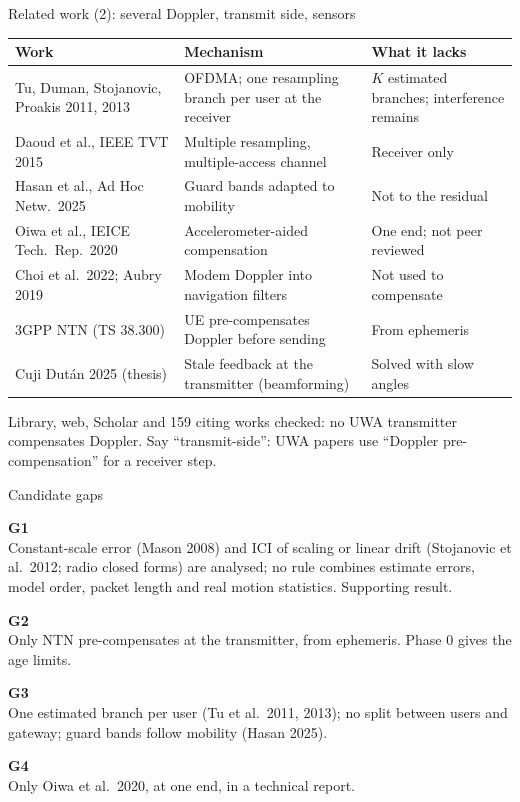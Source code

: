 \documentclass[aspectratio=169,11pt]{beamer}
\newcommand{\gapbox}[3]{%
  \begin{tcolorbox}[colback=foam!60,colframe=foam!60,arc=2mm,boxrule=0pt,left=2mm,right=2mm,top=0.6mm,bottom=0.6mm,before skip=0.8mm,after skip=0.8mm]
  {\bfseries\color{teal}#1}\hspace{1mm}{\small\bfseries #2}\\
  {\footnotesize #3}
  \end{tcolorbox}}
\begin{document}
\begin{frame}{Related work (2): several Doppler, transmit side, sensors}
\scriptsize\setlength{\tabcolsep}{3pt}\renewcommand{\arraystretch}{0.92}
\begin{tabular}{@{}L{0.33\textwidth}L{0.33\textwidth}L{0.30\textwidth}@{}}
\toprule
\textbf{Work} & \textbf{Mechanism} & \textbf{What it lacks}\\
\midrule
Tu, Duman, Stojanovic, Proakis 2011, 2013 & OFDMA; one resampling branch per user at the receiver & $K$ estimated branches; interference remains\\
Daoud et al., IEEE TVT 2015 & Multiple resampling, multiple-access channel & Receiver only\\
Hasan et al., Ad Hoc Netw.\ 2025 & Guard bands adapted to mobility & Not to the residual\\
Oiwa et al., IEICE Tech.\ Rep.\ 2020 & Accelerometer-aided compensation & One end; not peer reviewed\\
Choi et al.\ 2022; Aubry 2019 & Modem Doppler into navigation filters & Not used to compensate\\
3GPP NTN (TS 38.300) & UE pre-compensates Doppler before sending & From ephemeris\\
Cuji Dut\'an 2025 (thesis) & Stale feedback at the transmitter (beamforming) & Solved with slow angles\\
\bottomrule
\end{tabular}

\vspace{1mm}
\footnotesize Library, web, Scholar and 159 citing works checked: no UWA transmitter compensates Doppler. Say ``transmit-side'': UWA papers use ``Doppler pre-compensation'' for a receiver step.
\end{frame}

\begin{frame}{Candidate gaps}
\gapbox{G1}{Partly open: no design rule for intra-packet compensation}{Constant-scale error (Mason 2008) and ICI of scaling or linear drift (Stojanovic et al.\ 2012; radio closed forms) are analysed; no rule combines estimate errors, model order, packet length and real motion statistics. Supporting result.}
\gapbox{G2}{No UWA transmitter compensates Doppler; placement vs estimate age not analysed}{Only NTN pre-compensates at the transmitter, from ephemeris. Phase 0 gives the age limits.}
\gapbox{G3}{Several Doppler handled only at the receiver}{One estimated branch per user (Tu et al.\ 2011, 2013); no split between users and gateway; guard bands follow mobility (Hasan 2025).}
\gapbox{G4}{Sensors drive navigation, not compensation}{Only Oiwa et al.\ 2020, at one end, in a technical report.}
\end{frame}
\end{document}
